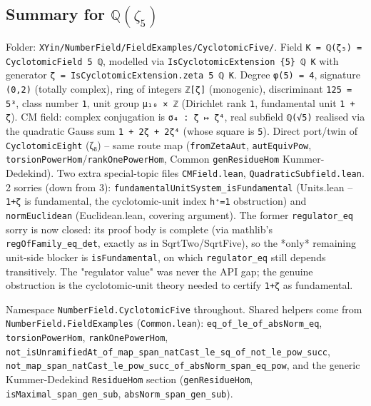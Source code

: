 \documentclass[UTF8,a4paper,11pt,fontset=fandol]{ctexart}
\theoremstyle{definition}
\begin{document}
\subsection{Summary for \(\mathbb Q(\zeta_5)\)}

Folder: \texttt{XYin/\allowbreak{}NumberField/\allowbreak{}FieldExamples/\allowbreak{}CyclotomicFive/\allowbreak{}}. Field \texttt{K = ℚ(ζ₅) = CyclotomicField 5 ℚ}, modelled via \texttt{IsCyclotomicExtension \{5\} ℚ K} with generator \texttt{ζ = IsCyclotomicExtension.\allowbreak{}zeta 5 ℚ K}. Degree \texttt{φ(5) = 4}, signature \texttt{(0,2)} (totally complex), ring of integers \texttt{ℤ[ζ]} (monogenic), discriminant \texttt{125 = 5³}, class number \texttt{1}, unit group \texttt{μ₁₀ × ℤ} (Dirichlet rank \texttt{1}, fundamental unit \texttt{1 + ζ}). CM field: complex conjugation is \texttt{σ₄ : ζ ↦ ζ⁴}, real subfield \texttt{ℚ(√5)} realised via the quadratic Gauss sum \texttt{1 + 2ζ + 2ζ⁴} (whose square is \texttt{5}). Direct port/twin of \texttt{CyclotomicEight} (ζ₈) -- same route map (\texttt{fromZetaAut}, \texttt{autEquivPow}, \texttt{torsionPowerHom}/\texttt{rankOnePowerHom}, Common \texttt{genResidueHom} Kummer-Dedekind). Two extra special-topic files \texttt{CMField.\allowbreak{}lean}, \texttt{QuadraticSubfield.\allowbreak{}lean}. 2 sorries (down from 3): \texttt{fundamentalUnitSystem\_\allowbreak{}isFundamental} (Units.lean -- \texttt{1+ζ} is fundamental, the cyclotomic-unit index \texttt{h⁺=1} obstruction) and \texttt{normEuclidean} (Euclidean.lean, covering argument). The former \texttt{regulator\_\allowbreak{}eq} sorry is now closed: its proof body is complete (via mathlib's \texttt{regOfFamily\_\allowbreak{}eq\_\allowbreak{}det}, exactly as in SqrtTwo/SqrtFive), so the *only* remaining unit-side blocker is \texttt{isFundamental}, on which \texttt{regulator\_\allowbreak{}eq} still depends transitively. The "regulator value" was never the API gap; the genuine obstruction is the cyclotomic-unit theory needed to certify \texttt{1+ζ} as fundamental.

Namespace \texttt{NumberField.\allowbreak{}CyclotomicFive} throughout. Shared helpers come from \texttt{NumberField.\allowbreak{}FieldExamples} (\texttt{Common.\allowbreak{}lean}): \texttt{eq\_\allowbreak{}of\_\allowbreak{}le\_\allowbreak{}of\_\allowbreak{}absNorm\_\allowbreak{}eq}, \texttt{torsionPowerHom}, \texttt{rankOnePowerHom}, \texttt{not\_\allowbreak{}isUnramifiedAt\_\allowbreak{}of\_\allowbreak{}map\_\allowbreak{}span\_\allowbreak{}natCast\_\allowbreak{}le\_\allowbreak{}sq\_\allowbreak{}of\_\allowbreak{}not\_\allowbreak{}le\_\allowbreak{}pow\_\allowbreak{}succ}, \texttt{not\_\allowbreak{}map\_\allowbreak{}span\_\allowbreak{}natCast\_\allowbreak{}le\_\allowbreak{}pow\_\allowbreak{}succ\_\allowbreak{}of\_\allowbreak{}absNorm\_\allowbreak{}span\_\allowbreak{}eq\_\allowbreak{}pow}, and the generic Kummer-Dedekind \texttt{ResidueHom} section (\texttt{genResidueHom}, \texttt{isMaximal\_\allowbreak{}span\_\allowbreak{}gen\_\allowbreak{}sub}, \texttt{absNorm\_\allowbreak{}span\_\allowbreak{}gen\_\allowbreak{}sub}).
\end{document}
